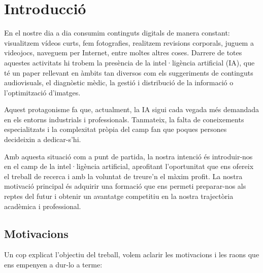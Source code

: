 \chapter{Introducció}
\label{c:intro}
En el nostre dia a dia consumim continguts digitals de manera constant: visualitzem vídeos curts, fem fotografies, realitzem revisions corporals, juguem a videojocs, naveguem per Internet, entre moltes altres coses. Darrere de totes aquestes activitats hi trobem la presència de la intel·ligència artificial (IA), que té un paper rellevant en àmbits tan diversos com els suggeriments de continguts audiovisuals, el diagnòstic mèdic, la gestió i distribució de la informació o l’optimització d’imatges.

Aquest protagonisme fa que, actualment, la IA sigui cada vegada més demandada en els entorns industrials i professionals. Tanmateix, la falta de coneixements especialitzats i la complexitat pròpia del camp fan que poques persones decideixin a dedicar-s’hi.

Amb aquesta situació com a punt de partida, la nostra intenció és introduir-nos en el camp de la intel·ligència artificial, aprofitant l’oportunitat que ens ofereix el treball de recerca i amb la voluntat de treure’n el màxim profit. La nostra motivació principal és adquirir una formació que ens permeti preparar-nos als reptes del futur i obtenir un avantatge competitiu en la nostra trajectòria acadèmica i professional.






\section{Motivacions}
Un cop explicat l’objectiu del treball, volem aclarir les motivacions i les raons que ens empenyen a dur-lo a terme:

